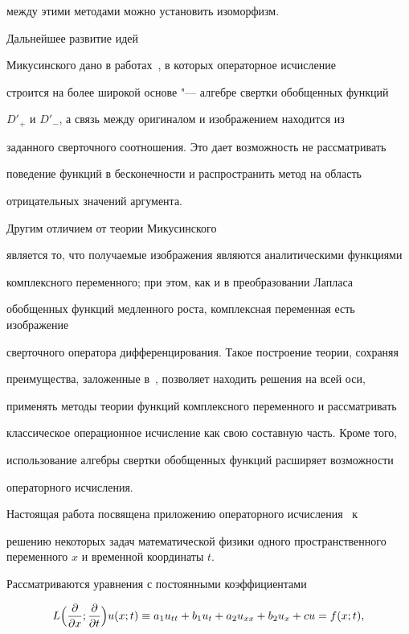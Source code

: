 между этими методами можно установить изоморфизм. 



Дальнейшее развитие идей 

Микусинского дано в работах~\cite{kogan:bib15,kogan:bib16}, в которых операторное исчисление 

строится на более широкой основе "--- алгебре свертки обобщенных функций 

$D'_{+}$ и $D'_{-}$, а связь между оригиналом и изображением находится из 

заданного сверточного соотношения. Это дает возможность не рассматривать 

поведение функций в бесконечности и распространить метод на область 

отрицательных значений аргумента. 

Другим отличием от теории Микусинского 

является то, что получаемые изображения являются аналитическими функциями 

комплексного переменного; при этом, как и в преобразовании Лапласа 

обобщенных функций медленного роста, комплексная переменная есть изображение 

сверточного оператора дифференцирования. Такое построение теории, сохраняя 

преимущества, заложенные в~\cite{kogan:bib14}, позволяет находить решения на всей оси, 

применять методы теории функций комплексного переменного и рассматривать 

классическое операционное исчисление как свою составную часть. Кроме того, 

использование алгебры свертки обобщенных функций расширяет возможности 

операторного исчисления.



Настоящая работа посвящена приложению операторного исчисления~\cite{kogan:bib15,kogan:bib16} к 

решению некоторых задач математической физики одного пространственного переменного $x$ и временной координаты $t$. 

Рассматриваются уравнения с постоянными коэффициентами

\begin{equation}

\label{kogan:eq1}

L\Bigl( \frac{\partial }{\partial x}; \frac{\partial}{\partial t} \Bigr) u(x;t)\equiv a_1 u_{tt} +b_1 u_t +a_2 u_{xx} +b_2 u_x + c u=f(x;t),

\end{equation} 

